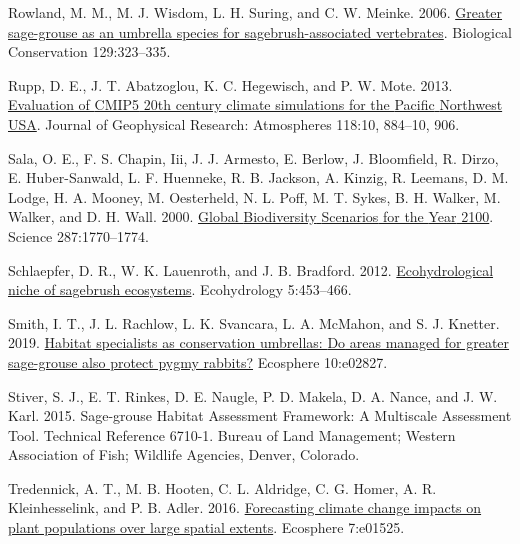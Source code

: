 \documentclass[
  12pt,
]{article}
\newlength{\cslhangindent}
\newlength{\cslentryspacingunit} %
\newenvironment{CSLReferences}[2] %
 {%
  \setlength{\parindent}{0pt}
  \ifodd #1
  \let\oldpar\par
  \def\par{\hangindent=\cslhangindent\oldpar}
  \fi
  \setlength{\parskip}{#2\cslentryspacingunit}
 }%
 {}
\begin{document}
\begin{CSLReferences}{1}{0}
\leavevmode{}%
Rowland, M. M., M. J. Wisdom, L. H. Suring, and C. W. Meinke. 2006. \href{https://doi.org/10.1016/j.biocon.2005.10.048}{Greater sage-grouse as an umbrella species for sagebrush-associated vertebrates}. Biological Conservation 129:323--335.

\leavevmode{}%
Rupp, D. E., J. T. Abatzoglou, K. C. Hegewisch, and P. W. Mote. 2013. \href{https://doi.org/10.1002/jgrd.50843}{Evaluation of {CMIP5} 20th century climate simulations for the {Pacific} {Northwest} {USA}}. Journal of Geophysical Research: Atmospheres 118:10, 884--10, 906.

\leavevmode{}%
Sala, O. E., F. S. Chapin, Iii, J. J. Armesto, E. Berlow, J. Bloomfield, R. Dirzo, E. Huber-Sanwald, L. F. Huenneke, R. B. Jackson, A. Kinzig, R. Leemans, D. M. Lodge, H. A. Mooney, M. Oesterheld, N. L. Poff, M. T. Sykes, B. H. Walker, M. Walker, and D. H. Wall. 2000. \href{https://doi.org/10.1126/science.287.5459.1770}{Global {Biodiversity} {Scenarios} for the {Year} 2100}. Science 287:1770--1774.

\leavevmode{}%
Schlaepfer, D. R., W. K. Lauenroth, and J. B. Bradford. 2012. \href{https://doi.org/10.1002/eco.238}{Ecohydrological niche of sagebrush ecosystems}. Ecohydrology 5:453--466.

\leavevmode{}%
Smith, I. T., J. L. Rachlow, L. K. Svancara, L. A. McMahon, and S. J. Knetter. 2019. \href{https://doi.org/10.1002/ecs2.2827}{Habitat specialists as conservation umbrellas: {Do} areas managed for greater sage-grouse also protect pygmy rabbits?} Ecosphere 10:e02827.

\leavevmode{}%
Stiver, S. J., E. T. Rinkes, D. E. Naugle, P. D. Makela, D. A. Nance, and J. W. Karl. 2015. Sage-grouse {Habitat} {Assessment} {Framework}: {A} {Multiscale} {Assessment} {Tool}. {Technical} {Reference} 6710-1. Bureau of Land Management; Western Association of Fish; Wildlife Agencies, Denver, Colorado.

\leavevmode{}%
Tredennick, A. T., M. B. Hooten, C. L. Aldridge, C. G. Homer, A. R. Kleinhesselink, and P. B. Adler. 2016. \href{https://doi.org/10.1002/ecs2.1525}{Forecasting climate change impacts on plant populations over large spatial extents}. Ecosphere 7:e01525.


\end{CSLReferences}
\end{document}
